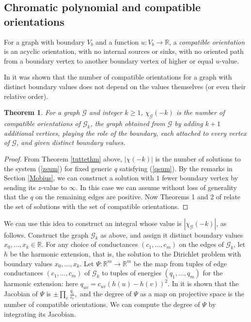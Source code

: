 \documentclass[12pt]{amsart}
\newtheorem{theorem}{Theorem}
\newcommand{\R}{{\mathbb R}}
\newcommand{\G}{{\mathcal G}}
\begin{document}
\subsection{Chromatic polynomial and compatible orientations}

For a graph with boundary $V_b$ and a function $u:V_b\to\R$, a \emph{compatible orientation}
is an acyclic orientation, with no internal sources or sinks, with no oriented path from a
boundary vertex to another boundary vertex of higher or equal $u$-value.

In \cite{Abrams2015} it was shown that the number of compatible orientations for a graph with distinct 
boundary values does not depend on the values themselves (or even their relative order).

\begin{theorem}\label{orient} For a graph $\G$ and integer $k\ge 1$, $\chi_{\G}(-k)$ is the number of compatible orientations of $\G_k$,
the graph obtained from $\G$ by adding $k+1$ additional vertices, playing the role of the boundary,
each attached to every vertex of $\G$, and given distinct boundary values.
\end{theorem}

\begin{proof}
From Theorem \ref{tuttethm} above, $|\chi(-k)|$ is the number of solutions to the system (\ref{zsum})
for fixed generic $q$ satisfying (\ref{qsum}). By the remarks in Section \ref{Mobius}, we can 
construct a solution with $1$ fewer boundary vertex by sending its $z$-value to $\infty$.
In this case we can assume without loss of generality that the $q$ on the remaining edges are
positive. Now Theorems 1 and 2 of \cite{Abrams2015} relate the set of solutions with the set of compatible orientations.
\end{proof}

We can use this idea to construct an integral whose value is $|\chi_{\G}(-k)|$, as follows.
Construct the graph $\G_k$ as above, and assign it distinct boundary values $x_0,\dots,x_k\in\R$. 
For any choice of conductances $(c_1,\dots,c_m)$ on the edges of $\G_k$, let $h$ be the harmonic extension,
that is, the solution to the Dirichlet problem with boundary values $x_0,\dots,x_k$.
Let $\Psi:\R^m\to\R^m$ be the map from tuples of edge conductances $(c_1,\dots,c_m)$ of $\G_k$ to tuples of energies 
$(q_1,\dots,q_m)$ for the harmonic extension: here $q_{uv} = c_{uv}(h(u)-h(v))^2$. 
In \cite{Abrams2015} it is shown that the Jacobian of $\Psi$ is
$\pm\prod_e \frac{q_e}{c_e},$ and the degree of $\Psi$ as a map on projective space is the number of compatible orientations.
We can compute the degree of $\Psi$ by integrating its Jacobian. 
\end{document}
